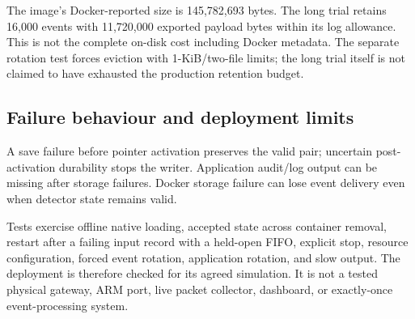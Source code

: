 The image's Docker-reported size is 145,782,693 bytes. The long trial retains
16,000 events with 11,720,000 exported payload bytes within its log allowance.
This is not the complete on-disk cost including Docker metadata.
The separate rotation test forces eviction with 1-KiB/two-file limits; the long
trial itself is not claimed to have exhausted the production retention budget.

\subsection{Failure behaviour and deployment limits}

A save failure before pointer activation preserves the valid pair; uncertain
post-activation durability stops the writer. Application audit/log output can
be missing after storage failures. Docker storage failure can lose event
delivery even when detector state remains valid.

Tests exercise offline native loading, accepted state across container removal,
restart after a failing input record with a held-open FIFO, explicit stop,
resource configuration, forced event rotation, application rotation, and slow
output. The deployment is therefore checked for its agreed simulation.
It is not a tested physical gateway, ARM port, live packet collector, dashboard,
or exactly-once event-processing system.
